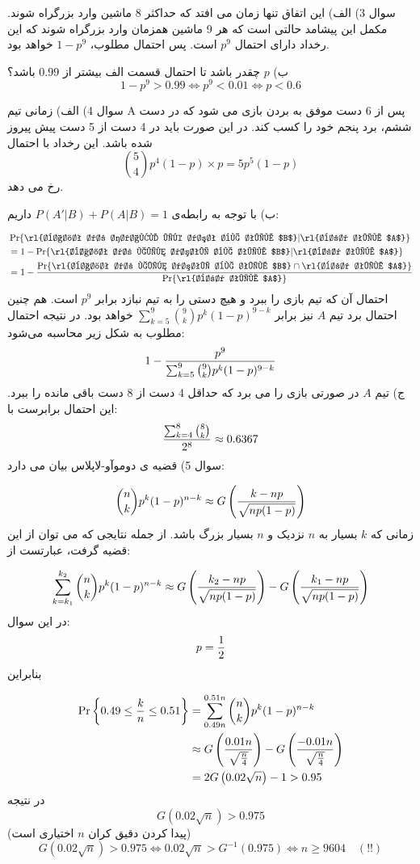 \documentclass[10pt,letterpaper]{report}
\newcommand{\eqn}[1]{
\[\begin{split}
#1
\end{split}\]
}
\begin{document}
سوال 3) الف) این اتفاق تنها زمان می افتد که حداکثر 8 ماشین وارد بزرگراه شوند. مکمل این پیشامد حالتی است که هر 9 ماشین همزمان وارد بزرگراه شوند که این رخداد دارای احتمال 
$
p^9
$
است. پس احتمال مطلوب، 
$
1-p^9
$
خواهد بود.

ب) $p$ چقدر باشد تا احتمال قسمت الف بیشتر از $0.99$ باشد؟
$$
1-p^9>0.99\iff p^9<0.01\iff p<0.6
$$

سوال 4) الف) زمانی تیم A پس از 6 دست موفق به بردن بازی می شود که در دست ششم، برد پنجم خود را کسب کند. در این صورت باید در 4 دست از 5 دست پیش پیروز شده باشد. این رخداد با احتمال
$$
\binom{5}{4}p^4(1-p)\times p=5p^5(1-p)
$$
رخ می دهد.

ب) با توجه به رابطه‌ی 
$
P(A'|B)+P(A|B)=1
$
داریم:
\eqn{
&\Pr\{
\text{\rl{باخت در حداقل یک دست به تیم $B$}}|\text{\rl{برد تیم $A$}}
\}
\\&=
1-\Pr\{
\text{\rl{باخت در هیچ دستی به تیم $B$}}|\text{\rl{برد تیم $A$}}
\}
\\&=
1-{
\Pr\{
\text{\rl{باخت در هیچ دستی به تیم $B$}}\cap\text{\rl{برد تیم $A$}}
\}
\over
\Pr\{
\text{\rl{برد تیم $A$}}
\}
}
}{}
احتمال آن که تیم  بازی را ببرد و هیچ دستی را به تیم  نبازد برابر $p^9$ است. هم چنین احتمال برد تیم $A$ نیز برابر 
$
\sum_{k=5}^{9}\binom{9}{k}p^k(1-p)^{9-k}
$
 خواهد بود. در نتیجه احتمال مطلوب به شکل زیر محاسبه می‌شود:
$$
1-{p^9\over \sum_{k=5}^{9}\binom{9}{k}p^k(1-p)^{9-k}}
$$
ج) تیم $A$ در صورتی بازی را می برد که حداقل 4 دست از 8 دست باقی مانده را ببرد. این احتمال برابرست با:
$$
{\sum_{k=4}^{8}\binom{8}{k}\over 2^8}\approx 0.6367
$$
سوال 5) قضیه ی دوموآو-لاپلاس بیان می دارد:
\eqn{
\binom{n}{k}p^k(1-p)^{n-k}\approx G\left({k-np\over\sqrt{np(1-p)}}\right)
}{}
زمانی که $k$ بسیار به $n$ نزدیک و $n$ بسیار بزرگ باشد. از جمله نتایجی که می توان از این قضیه گرفت، عبارتست از:
\eqn{
\sum_{k=k_1}^{k_2}\binom{n}{k}p^k(1-p)^{n-k}\approx
G\left({k_2-np\over\sqrt{np(1-p)}}\right)
-
G\left({k_1-np\over\sqrt{np(1-p)}}\right)
}{}
در این سوال:
$$
p={1\over 2}
$$
بنابراین
\eqn{
\Pr\left\{0.49\le{k\over n}\le0.51\right\}&=
\sum_{0.49n}^{0.51n}\binom{n}{k}p^k(1-p)^{n-k}
\\&\approx
G\left({0.01n\over\sqrt{n\over 4}}\right)
-
G\left({-0.01n\over\sqrt{n\over 4}}\right)
\\&=
2G\left({0.02\sqrt n}\right)-1
>0.95
}{}
در نتیجه
$$
G\left({0.02\sqrt n}\right)>0.975
$$
{\color{red}
(پیدا کردن دقیق کران $n$ اختیاری است)
}
$$
G\left({0.02\sqrt n}\right)>0.975\iff {0.02\sqrt n}>G^{-1}(0.975)\iff n\ge 9604\quad(!!)
$$
\end{document}
